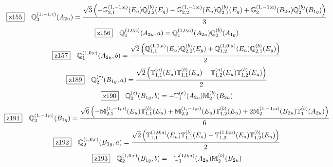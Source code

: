 \documentclass[fleqn,10pt,landscape]{jsarticle}
\begin{document}
\begin{dmath*}
\hspace*{3mm}\fbox{z155}\quad \mathbb{Q}_{3}^{(1,-1;c)}(A_{2u})=\frac{\sqrt{3} \left(- \mathbb{G}_{2,1}^{(1,-1;a)}(E_{u}) \mathbb{Q}_{2,2}^{(b)}(E_{g}) - \mathbb{G}_{2,2}^{(1,-1;a)}(E_{u}) \mathbb{Q}_{2,1}^{(b)}(E_{g}) + \mathbb{G}_{2}^{(1,-1;a)}(B_{2u}) \mathbb{Q}_{2}^{(b)}(B_{1g})\right)}{3}
\end{dmath*}
\begin{dmath*}
\hspace*{3mm}\fbox{z156}\quad \mathbb{Q}_{1}^{(1,0;c)}(A_{2u},a)=\mathbb{Q}_{1}^{(1,0;a)}(A_{2u}) \mathbb{Q}_{0}^{(b)}(A_{1g})
\end{dmath*}
\begin{dmath*}
\hspace*{3mm}\fbox{z157}\quad \mathbb{Q}_{1}^{(1,0;c)}(A_{2u},b)=\frac{\sqrt{2} \left(\mathbb{Q}_{1,1}^{(1,0;a)}(E_{u}) \mathbb{Q}_{2,2}^{(b)}(E_{g}) + \mathbb{Q}_{1,2}^{(1,0;a)}(E_{u}) \mathbb{Q}_{2,1}^{(b)}(E_{g})\right)}{2}
\end{dmath*}
\begin{dmath*}
\hspace*{3mm}\fbox{z189}\quad \mathbb{Q}_{2}^{(c)}(B_{1g},a)=\frac{\sqrt{2} \left(\mathbb{T}_{1,1}^{(a)}(E_{u}) \mathbb{T}_{1,1}^{(b)}(E_{u}) - \mathbb{T}_{1,2}^{(a)}(E_{u}) \mathbb{T}_{1,2}^{(b)}(E_{u})\right)}{2}
\end{dmath*}
\begin{dmath*}
\hspace*{3mm}\fbox{z190}\quad \mathbb{Q}_{2}^{(c)}(B_{1g},b)=- \mathbb{T}_{1}^{(a)}(A_{2u}) \mathbb{M}_{2}^{(b)}(B_{2u})
\end{dmath*}
\begin{dmath*}
\hspace*{3mm}\fbox{z191}\quad \mathbb{Q}_{2}^{(1,-1;c)}(B_{1g})=\frac{\sqrt{6} \left(- \mathbb{M}_{2,1}^{(1,-1;a)}(E_{u}) \mathbb{T}_{1,1}^{(b)}(E_{u}) + \mathbb{M}_{2,2}^{(1,-1;a)}(E_{u}) \mathbb{T}_{1,2}^{(b)}(E_{u}) + 2 \mathbb{M}_{2}^{(1,-1;a)}(B_{2u}) \mathbb{T}_{1}^{(b)}(A_{2u})\right)}{6}
\end{dmath*}
\begin{dmath*}
\hspace*{3mm}\fbox{z192}\quad \mathbb{Q}_{2}^{(1,0;c)}(B_{1g},a)=\frac{\sqrt{2} \left(\mathbb{T}_{1,1}^{(1,0;a)}(E_{u}) \mathbb{T}_{1,1}^{(b)}(E_{u}) - \mathbb{T}_{1,2}^{(1,0;a)}(E_{u}) \mathbb{T}_{1,2}^{(b)}(E_{u})\right)}{2}
\end{dmath*}
\begin{dmath*}
\hspace*{3mm}\fbox{z193}\quad \mathbb{Q}_{2}^{(1,0;c)}(B_{1g},b)=- \mathbb{T}_{1}^{(1,0;a)}(A_{2u}) \mathbb{M}_{2}^{(b)}(B_{2u})
\end{dmath*}
\end{document}
